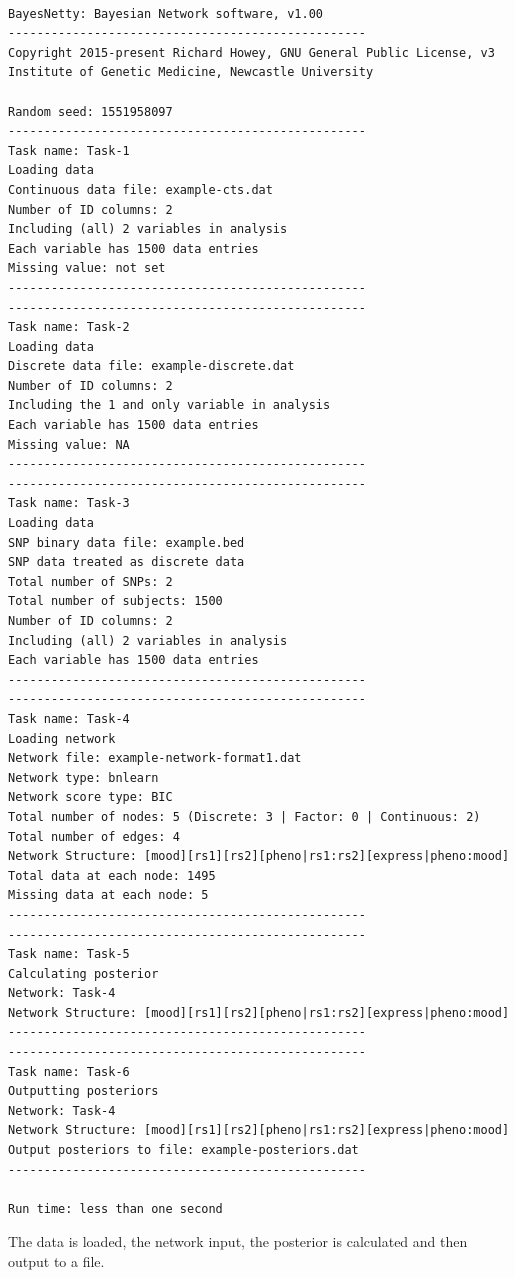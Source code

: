 \documentclass[a4paper,12pt]{article}
\begin{document}
\vspace{0.35cm} \begin{lstlisting}

BayesNetty: Bayesian Network software, v1.00
--------------------------------------------------
Copyright 2015-present Richard Howey, GNU General Public License, v3
Institute of Genetic Medicine, Newcastle University

Random seed: 1551958097
--------------------------------------------------
Task name: Task-1
Loading data
Continuous data file: example-cts.dat
Number of ID columns: 2
Including (all) 2 variables in analysis
Each variable has 1500 data entries
Missing value: not set
--------------------------------------------------
--------------------------------------------------
Task name: Task-2
Loading data
Discrete data file: example-discrete.dat
Number of ID columns: 2
Including the 1 and only variable in analysis
Each variable has 1500 data entries
Missing value: NA
--------------------------------------------------
--------------------------------------------------
Task name: Task-3
Loading data
SNP binary data file: example.bed
SNP data treated as discrete data
Total number of SNPs: 2
Total number of subjects: 1500
Number of ID columns: 2
Including (all) 2 variables in analysis
Each variable has 1500 data entries
--------------------------------------------------
--------------------------------------------------
Task name: Task-4
Loading network
Network file: example-network-format1.dat
Network type: bnlearn
Network score type: BIC
Total number of nodes: 5 (Discrete: 3 | Factor: 0 | Continuous: 2)
Total number of edges: 4
Network Structure: [mood][rs1][rs2][pheno|rs1:rs2][express|pheno:mood]
Total data at each node: 1495
Missing data at each node: 5
--------------------------------------------------
--------------------------------------------------
Task name: Task-5
Calculating posterior
Network: Task-4
Network Structure: [mood][rs1][rs2][pheno|rs1:rs2][express|pheno:mood]
--------------------------------------------------
--------------------------------------------------
Task name: Task-6
Outputting posteriors
Network: Task-4
Network Structure: [mood][rs1][rs2][pheno|rs1:rs2][express|pheno:mood]
Output posteriors to file: example-posteriors.dat
--------------------------------------------------

Run time: less than one second

\end{lstlisting} \vspace{0.35cm}
The data is loaded, the network input, the posterior is calculated and then output to a file. 
\end{document}
